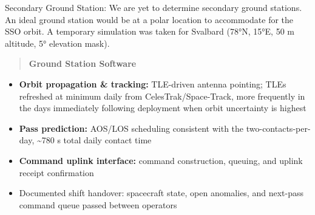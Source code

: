 Secondary Ground Station: We are yet to determine secondary ground
stations. An ideal ground station would be at a polar location to
accommodate for the SSO orbit. A temporary simulation was taken for
Svalbard (78°N, 15°E, 50 m altitude, 5° elevation mask).

\begin{quote}
\textbf{Ground Station Software}
\end{quote}

\begin{itemize}
\item
  \textbf{Orbit propagation \& tracking:} TLE-driven antenna pointing;
  TLEs refreshed at minimum daily from CelesTrak/Space-Track, more
  frequently in the days immediately following deployment when orbit
  uncertainty is highest
\item
  \textbf{Pass prediction:} AOS/LOS scheduling consistent with the
  two-contacts-per-day, \textasciitilde780 s total daily contact time
\item
  \textbf{Command uplink interface:} command construction, queuing, and
  uplink receipt confirmation
\end{itemize}

\begin{itemize}
\item
  Documented shift handover: spacecraft state, open anomalies, and
  next-pass command queue passed between operators
\end{itemize}


